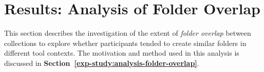 \newpage
\section{Results: Analysis of Folder Overlap}
\label{exp-study:Results-folder-overlap}
This section describes the investigation of the extent of \textit{folder overlap} between collections to explore whether participants tended to create similar folders in different tool contexts. The motivation and method used in this analysis is discussed in \textbf{Section~\ref{exp-study:analysis-folder-overlap}}.

